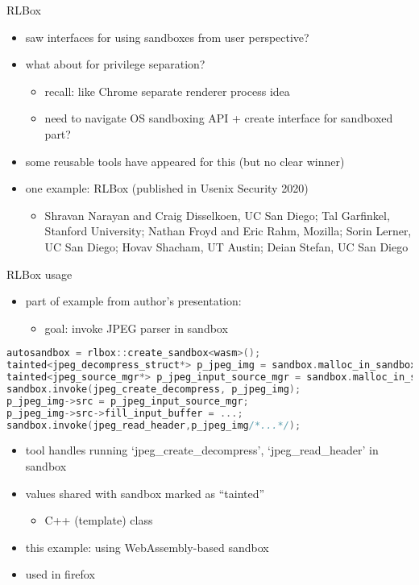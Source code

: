 \begin{frame}{RLBox}
    \begin{itemize}
    \item saw interfaces for using sandboxes from user perspective?
    \item what about for privilege separation?
        \begin{itemize}
        \item recall: like Chrome separate renderer process idea
        \item need to navigate OS sandboxing API + create interface for sandboxed part?
        \end{itemize}
    \vspace{.5cm}
    \item some reusable tools have appeared for this (but no clear winner)
    \item one example: RLBox (published in Usenix Security 2020)
        \begin{itemize}
        \item Shravan Narayan and Craig Disselkoen, UC San Diego; Tal Garfinkel, Stanford University; Nathan Froyd and Eric Rahm, Mozilla; Sorin Lerner, UC San Diego; Hovav Shacham, UT Austin; Deian Stefan, UC San Diego
        \end{itemize}
    \end{itemize}
\end{frame}

\begin{frame}[fragile,label=rlboxusage]{RLBox usage}
\begin{itemize}
\item part of example from author's presentation:
    \begin{itemize}
    \item goal: invoke JPEG parser in sandbox
    \end{itemize}
\end{itemize}
\begin{lstlisting}[language=C++,style=script]
autosandbox = rlbox::create_sandbox<wasm>();
tainted<jpeg_decompress_struct*> p_jpeg_img = sandbox.malloc_in_sandbox<jpeg_decompress_struct>();
tainted<jpeg_source_mgr*> p_jpeg_input_source_mgr = sandbox.malloc_in_sandbox<jpeg_source_mgr>();
sandbox.invoke(jpeg_create_decompress, p_jpeg_img);
p_jpeg_img->src = p_jpeg_input_source_mgr;
p_jpeg_img->src->fill_input_buffer = ...;
sandbox.invoke(jpeg_read_header,p_jpeg_img/*...*/);
\end{lstlisting}
\begin{itemize}
\item tool handles running `jpeg\_create\_decompress', `jpeg\_read\_header' in sandbox
\item values shared with sandbox marked as ``tainted''
    \begin{itemize}
    \item C++ (template) class
    \end{itemize}
\item this example: using WebAssembly-based sandbox
\item used in firefox
\end{itemize}
\end{frame}
